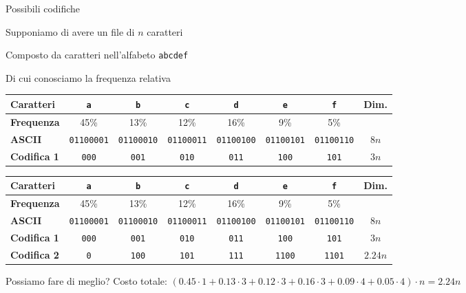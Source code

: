 \begin{frame}{Possibili codifiche}

\vspace{-9pt}
\begin{myboxtitle}[Esempio]
\BI
\item Supponiamo di avere un file di $n$ caratteri
\item Composto da caratteri nell'alfabeto \texttt{abcdef}
\item Di cui conosciamo la frequenza relativa
\EI
\end{myboxtitle}

\bigskip
\begin{overprint}
\begin{tabular}{|l|c|c|c|c|c|c|c|}
\hline
\textbf{Caratteri} & \texttt{a} & \texttt{b} & \texttt{c} & \texttt{d} & \texttt{e} & \texttt{f} & \textbf{Dim.} \\\hline
\textbf{Frequenza} & 45\% & 13\% & 12\% & 16\% & 9\% & 5\% & \\ \hline
\textbf{ASCII} & \texttt{\tiny 01100001} & \texttt{\tiny 01100010} & \texttt{\tiny 01100011} & \texttt{\tiny 01100100} & \texttt{\tiny 01100101} & \texttt{\tiny 01100110} & $8n$ \\\hline
\textbf{Codifica 1} & \texttt{\small 000} & \texttt{\small 001} & \texttt{\small 010} & \texttt{\small 011} & \texttt{\small 100} & \texttt{\small 101} & $3n$ \\\hline
\end{tabular}
\begin{tabular}{|l|c|c|c|c|c|c|c|}
\hline
\textbf{Caratteri} & \texttt{a} & \texttt{b} & \texttt{c} & \texttt{d} & \texttt{e} & \texttt{f} & \textbf{Dim.} \\\hline
\textbf{Frequenza} & 45\% & 13\% & 12\% & 16\% & 9\% & 5\% & \\ \hline
\textbf{ASCII} & \texttt{\tiny 01100001} & \texttt{\tiny 01100010} & \texttt{\tiny 01100011} & \texttt{\tiny 01100100} & \texttt{\tiny 01100101} & \texttt{\tiny 01100110} & $8n$ \\\hline
\textbf{Codifica 1} & \texttt{\small 000} & \texttt{\small 001} & \texttt{\small 010} & \texttt{\small 011} & \texttt{\small 100} & \texttt{\small 101} & $3n$ \\\hline
\textbf{Codifica 2} & \texttt{\small 0} & \texttt{\small 100} & \texttt{\small 101} & \texttt{\small 111} & \texttt{\small 1100} & \texttt{\small 1101} & $2.24n$ \\\hline
\end{tabular}
\end{overprint}
\bigskip
\begin{overprint}
\alert{Possiamo fare di meglio?}
\alert{Costo totale}: $(0.45 \cdot 1+0.13 \cdot 3+0.12 \cdot 3+0.16 \cdot 3+0.09 \cdot 4+0.05 \cdot 4) \cdot n=2.24n$
\end{overprint}
\end{frame}

